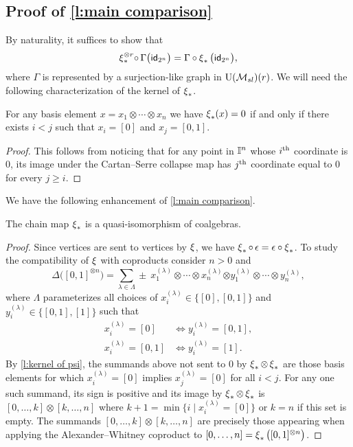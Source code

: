 \subsection{Proof of \cref{l:main comparison}} \label{ss:comparison proof}

By naturality, it suffices to show that
\begin{equation} \label{e:Cartan--Serre E-coalgebra map}
\operatorname{\xi}_\ast^{\otimes r} \! \circ \, \Gamma \big( \mathsf{id}_{2^n} \big) =
\Gamma \circ \operatorname{\xi}_\ast \big( \mathsf{id}_{2^n} \big),
\end{equation}
where $\Gamma$ is represented by a surjection-like graph in ${\operatorname{U}(\mathcal{M}_{sl})}(r)$.
We will need the following characterization of the kernel of $\operatorname{\xi}_\ast$.
\begin{lemma} \label{l:kernel of psi}
	For any basis element $x = x_1 \otimes \cdots \otimes x_n$ we have $\operatorname{\xi}_\ast(x) = 0$ if and only if there exists $i < j$ such that $x_i = [0]$ and $x_j = [0,1]$.
\end{lemma}

\begin{proof}
	This follows from noticing that for any point in $\mathbb{I}^n$ whose $i^{\mathrm{th}}$ coordinate is $0$, its image under the Cartan--Serre collapse map has $j^{\mathrm{th}}$ coordinate equal to $0$ for every $j \geq i$.
\end{proof}

We have the following enhancement of \cref{l:main comparison}.

\begin{lemma}
	The chain map $\operatorname{\xi}_\ast$ is a quasi-isomorphism of coalgebras.
\end{lemma}

\begin{proof}
	Since vertices are sent to vertices by $\operatorname{\xi}$, we have $\operatorname{\xi}_\ast \circ \, \epsilon = \epsilon \circ \operatorname{\xi}_\ast$.
	To study the compatibility of $\operatorname{\xi}$ with coproducts consider $n > 0$ and
	\[
	\Delta \big( [0,1]^{\otimes n} \big) = \sum_{\lambda \in \Lambda} \pm \ x_1^{(\lambda)} \otimes \cdots \otimes x_n^{(\lambda)} \bm{\otimes} y_1^{(\lambda)} \otimes \cdots \otimes y_n^{(\lambda)},
	\]
	where $\Lambda$ parameterizes all choices of $x_i^{(\lambda)} \in \{[0], [0,1]\}$ and $y_i^{(\lambda)} \in \{[0,1], [1]\}$ such that
	\begin{align*}
	x_i^{(\lambda)} = [0]   & \iff y_i^{(\lambda)} = [0,1], \\
	x_i^{(\lambda)} = [0,1] & \iff y_i^{(\lambda)} = [1].
	\end{align*}
	By \cref{l:kernel of psi}, the summands above not sent to $0$ by $\operatorname{\xi}_\ast \otimes \operatorname{\xi}_\ast$ are those basis elements for which $x_i^{(\lambda)} = [0]$ implies $x_j^{(\lambda)} = [0]$ for all $i < j$.
	For any one such summand, its sign is positive and its image by $\operatorname{\xi}_\ast \otimes \operatorname{\xi}_\ast$ is $[0, \dots, k] \otimes [k, \dots, n]$ where $k+1 = \min \{i \mid x_i^{(\lambda)} = [0]\}$ or $k = n$ if this set is empty.
	The summands $[0, \dots, k] \otimes [k, \dots, n]$ are precisely those appearing when applying the Alexander--Whitney coproduct to $[0, \dots, n] = \operatorname{\xi}_\ast \big( [0,1]^{\otimes n} \big)$.
\end{proof}

